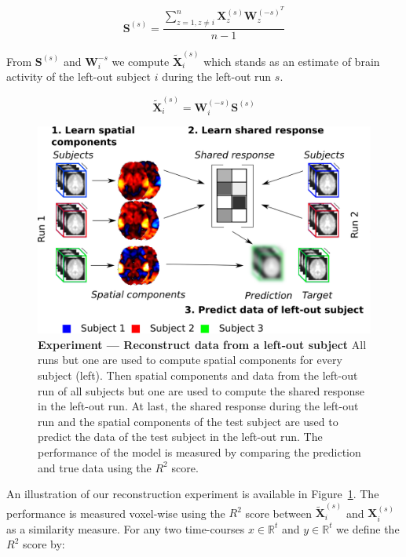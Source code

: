 \documentclass{report}
\begin{document}
{\begin{equation*}
	\mathbf{S}^{(s)} = \frac{\sum_{z=1, z\neq i}^n \mathbf{X}^{(s)}_z\mathbf{W}^{(-s)^T}_z}{n - 1}
\end{equation*}

From $\mathbf{S}^{(s)}$ and $\mathbf{W}_i^{-s}$ we compute $\widetilde{\mathbf{X}}^{(s)}_i$ which stands as an estimate of brain activity of the left-out subject $i$ during the left-out run $s$.

\begin{equation*}
	\widetilde{\mathbf{X}}_i^{(s)} = \mathbf{W}^{(-s)}_i \mathbf{S}^{(s)}
\end{equation*}


\begin{figure}
\centering
\includegraphics[scale=0.24]{figures/srm/conceptual_figure41.png}
\caption{\textbf{Experiment — Reconstruct data from a left-out subject} All runs but one are used to compute spatial components for every subject (left).
  Then spatial components and data from the left-out run of all subjects but one are used to compute the shared response in the left-out run.
  At last, the shared response during the left-out run and  the spatial components of the test subject are used to predict the data of the test subject in the left-out run.
  The performance of the model is measured by comparing the prediction and true data using the $R^2$ score.}
\label{fig:experiment_reconstruction}
\end{figure}


An illustration of our reconstruction experiment is available in Figure~\ref{fig:experiment_reconstruction}.
%
The performance is measured voxel-wise using the $R^2$ score between $\widetilde{\mathbf{X}}_i^{(s)}$ and $\mathbf{X}_i^{(s)}$ as a similarity measure.
For any two time-courses $x \in \mathbb{R}^t$ and $y \in \mathbb{R}^t$ we define the $R^2$ score by:

}
\end{document}
